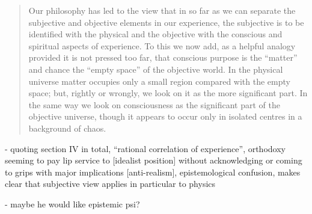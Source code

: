 \begin{quote}
    Our philosophy has led to the view that in so far as we can separate the subjective and objective elements in our experience, the subjective is to be identified with the physical and the objective with the conscious and spiritual aspects of experience.  To this we now add, as a helpful analogy provided it is not pressed too far, that conscious purpose is the ``matter'' and chance the ``empty space'' of the objective world.  In the physical universe matter occupies only a small region compared with the empty space; but, rightly or wrongly, we look on it as the more significant part.  In the same way we look on consciousness as the significant part of the objective universe, though it appears to occur only in isolated centres in a background of chaos.  \citep[p. 180-184]{Eddington1939}
\end{quote}

- quoting section IV in total, ``rational correlation of experience'', orthodoxy seeming to pay lip service to [idealist position] without acknowledging or coming to grips with major implications [anti-realism], epistemological confusion, makes clear that subjective view applies in particular to physics

- maybe he would like epistemic psi?

